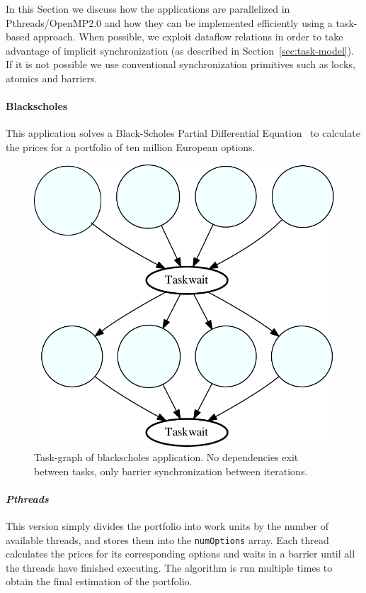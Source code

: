 In this Section we discuss how the \PARSEC{} applications are parallelized in Pthreads/OpenMP2.0 and how they can be implemented efficiently 
using a task-based approach.  When possible, we exploit dataflow relations in order to take advantage of implicit synchronization 
(as described in Section~\ref{sec:task-model}). If it is not possible we use conventional synchronization primitives such as locks,
atomics and barriers.

\paragraph{\textbf{Blackscholes}}
This application solves a Black-Scholes Partial Differential Equation~\cite{RePEc:ucp:jpolec:v:81:y:1973:i:3:p:637-54} to calculate the
prices for a portfolio of ten million European options.

\begin{figure}[t!]%
	\center
	\includegraphics[width=0.5\columnwidth]{task_benchmarks/figures/blackscholes_taskgraph}%
	\caption{Task-graph of blackscholes application.  No dependencies exit between tasks,
only barrier synchronization between iterations.}
	\label{fig:blackscholes_tg}%
	\vspace{.5cm}
\end{figure}

\paragraph{\textit{Pthreads}} This version simply divides the portfolio into
work units by the number of available threads, and stores them into the
\texttt{numOptions} array. Each thread calculates the prices for its
corresponding options and waits in a barrier until all the threads have
finished executing. The algorithm is run multiple times to obtain the final
estimation of the portfolio.


